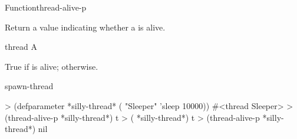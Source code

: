 \begin{functiondoc}{Function}{thread-alive-p}{ 
    \returns{} }

\fnsyntax

\fnpurpose Return a value indicating whether a  is alive.

\fnpackage {}

\fnmodule {}

\fnargs
\begin{args}{thread}
\arg[thread] A 
\end{args}

\fnreturns True if  is alive; \nil{} otherwise.

\fnerrors
\nothreads{}

\begin{alsos}{spawn-thread}
\end{alsos}

%
%
\fnexamples
%
\W\supp
\begin{example}
> (defparameter *silly-thread* ( "Sleeper" 'sleep 10000))
#<thread Sleeper>
> (thread-alive-p *silly-thread*)
t
> ( *silly-thread*)
t
> (thread-alive-p *silly-thread*)
nil
\end{example}

\end{functiondoc}


